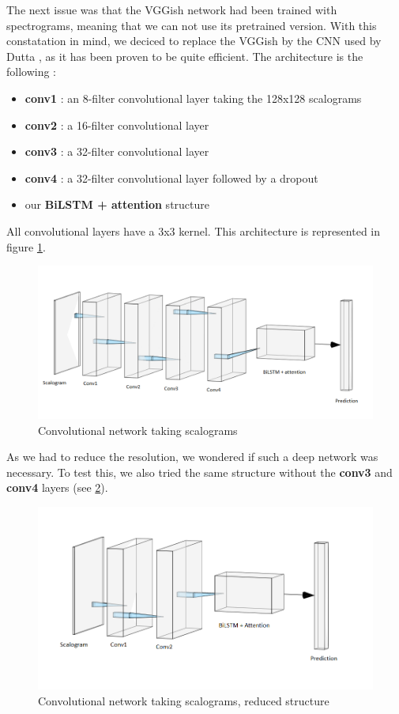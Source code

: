 \documentclass[final]{cvpr}
\begin{document}
The next issue was that the VGGish network had been trained with spectrograms, meaning that we can not use its pretrained version. With this constatation in mind, we deciced to replace the VGGish by the CNN used by Dutta \etal, as it has been proven to be quite efficient. The architecture is the following :
\begin{itemize}
	\item \textbf{conv1} : an 8-filter convolutional layer taking the 128x128 scalograms
	\item \textbf{conv2} : a 16-filter convolutional layer
	\item \textbf{conv3} : a 32-filter convolutional layer
	\item \textbf{conv4} : a 32-filter convolutional layer followed by a dropout
	\item our \textbf{BiLSTM + attention} structure
\end{itemize}
All convolutional layers have a 3x3 kernel. This architecture is represented in figure \ref{cnn}.
\begin{figure}
	\centering
	\includegraphics[scale = 0.65]{cnn.png}
	\caption{Convolutional network taking scalograms}
	\label{cnn}
\end{figure}
As we had to reduce the resolution, we wondered if such a deep network was necessary. To test this, we also tried the same structure without the \textbf{conv3} and \textbf{conv4} layers (see \ref{reduit}).
\begin{figure}
	\centering
	\includegraphics[scale = 0.45]{cnnreduit.png}
	\caption{Convolutional network taking scalograms, reduced structure}
	\label{reduit}
\end{figure}
\end{document}
